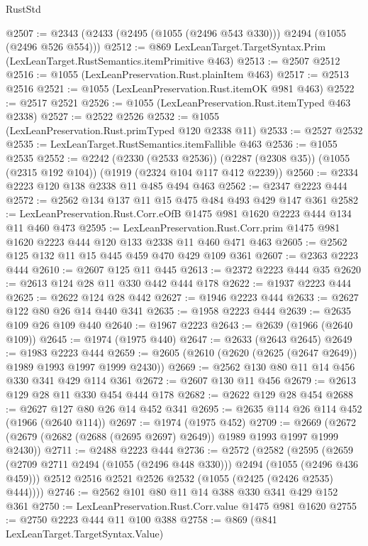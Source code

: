 \begin{lexlean}{RustStd}
\begin{coremodule}
@2507 := @2343 (@2433 (@2495 (@1055 (@2496 @543 @330))) @2494 (@1055 (@2496 @526 @554)))
@2512 := @869 LexLeanTarget.TargetSyntax.Prim (LexLeanTarget.RustSemantics.itemPrimitive @463)
@2513 := @2507 @2512
@2516 := @1055 (LexLeanPreservation.Rust.plainItem @463)
@2517 := @2513 @2516
@2521 := @1055 (LexLeanPreservation.Rust.itemOK @981 @463)
@2522 := @2517 @2521
@2526 := @1055 (LexLeanPreservation.Rust.itemTyped @463 @2338)
@2527 := @2522 @2526
@2532 := @1055 (LexLeanPreservation.Rust.primTyped @120 @2338 @11)
@2533 := @2527 @2532
@2535 := LexLeanTarget.RustSemantics.itemFallible @463
@2536 := @1055 @2535
@2552 := @2242
    (@2330 (@2533 @2536))
    (@2287 (@2308 @35))
    (@1055 (@2315 @192 @104))
    (@1919 (@2324 @104 @117 @412 @2239))
@2560 := @2334 @2223 @120 @138 @2338 @11 @485 @494 @463
@2562 := @2347 @2223 @444
@2572 := @2562 @134 @137 @11 @15 @475 @484 @493 @429 @147 @361
@2582 := LexLeanPreservation.Rust.Corr.eOfB @1475 @981 @1620 @2223 @444 @134 @11 @460 @473
@2595 := LexLeanPreservation.Rust.Corr.prim
    @1475
    @981
    @1620
    @2223
    @444
    @120
    @133
    @2338
    @11
    @460
    @471
    @463
@2605 := @2562 @125 @132 @11 @15 @445 @459 @470 @429 @109 @361
@2607 := @2363 @2223 @444
@2610 := @2607 @125 @11 @445
@2613 := @2372 @2223 @444 @35
@2620 := @2613 @124 @28 @11 @330 @442 @444 @178
@2622 := @1937 @2223 @444
@2625 := @2622 @124 @28 @442
@2627 := @1946 @2223 @444
@2633 := @2627 @122 @80 @26 @14 @440 @341
@2635 := @1958 @2223 @444
@2639 := @2635 @109 @26 @109 @440
@2640 := @1967 @2223
@2643 := @2639 (@1966 (@2640 @109))
@2645 := @1974 (@1975 @440)
@2647 := @2633 (@2643 @2645)
@2649 := @1983 @2223 @444
@2659 := @2605 (@2610 (@2620 (@2625 (@2647 @2649)) @1989 @1993 @1997 @1999 @2430))
@2669 := @2562 @130 @80 @11 @14 @456 @330 @341 @429 @114 @361
@2672 := @2607 @130 @11 @456
@2679 := @2613 @129 @28 @11 @330 @454 @444 @178
@2682 := @2622 @129 @28 @454
@2688 := @2627 @127 @80 @26 @14 @452 @341
@2695 := @2635 @114 @26 @114 @452 (@1966 (@2640 @114))
@2697 := @1974 (@1975 @452)
@2709 := @2669 (@2672 (@2679 (@2682 (@2688 (@2695 @2697) @2649)) @1989 @1993 @1997 @1999 @2430))
@2711 := @2488 @2223 @444
@2736 := @2572
    (@2582
      (@2595
        (@2659 (@2709 @2711 @2494 (@1055 (@2496 @448 @330))) @2494 (@1055 (@2496 @436 @459)))
        @2512
        @2516
        @2521
        @2526
        @2532
        (@1055 (@2425 (@2426 @2535) @444))))
@2746 := @2562 @101 @80 @11 @14 @388 @330 @341 @429 @152 @361
@2750 := LexLeanPreservation.Rust.Corr.value @1475 @981 @1620
@2755 := @2750 @2223 @444 @11 @100 @388
@2758 := @869 (@841 LexLeanTarget.TargetSyntax.Value)

\end{coremodule}
\end{lexlean}
